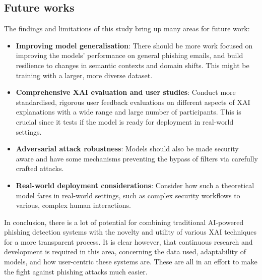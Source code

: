 
\subsection{Future works}
The findings and limitations of this study bring up many areas for future work:

\begin{itemize}
  \item \textbf{Improving model generalisation}: There should be more work focused on improving the models' performance on general phishing emails, and build resilience to changes in semantic contexts and domain shifts. This might be training with a larger, more diverse dataset.
  \item \textbf{Comprehensive XAI evaluation and user studies}: Conduct more standardised, rigorous user feedback evaluations on different aspects of XAI explanations with a wide range and large number of participants. This is crucial since it tests if the model is ready for deployment in real-world settings.
  \item \textbf{Adversarial attack robustness}: Models should also be made security aware and have some mechanisms preventing the bypass of filters via carefully crafted attacks.
  \item \textbf{Real-world deployment considerations}: Consider how such a theoretical model fares in real-world settings, such as complex security workflows to various, complex human interactions.
\end{itemize}

\noindent In conclusion, there is a lot of potential for combining traditional AI-powered phishing detection systems with the novelty and utility of various XAI techniques for a more transparent process. It is clear however, that continuous research and development is required in this area, concerning the data used, adaptability of models, and how user-centric these systems are. These are all in an effort to make the fight against phishing attacks much easier.

